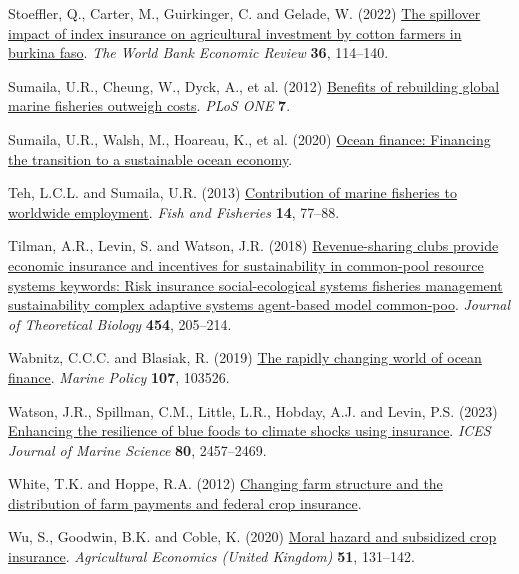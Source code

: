 \documentclass[
  letterpaper,
  DIV=11,
  numbers=noendperiod]{scrartcl}
\newlength{\cslhangindent}
\newlength{\cslentryspacingunit} %
\newenvironment{CSLReferences}[2] %
 {%
  \setlength{\parindent}{0pt}
  \ifodd #1
  \let\oldpar\par
  \def\par{\hangindent=\cslhangindent\oldpar}
  \fi
  \setlength{\parskip}{#2\cslentryspacingunit}
 }%
 {}
\theoremstyle{plain}
\theoremstyle{plain}
\theoremstyle{remark}
\begin{document}
\begin{CSLReferences}{1}{0}
\leavevmode{}%
Stoeffler, Q., Carter, M., Guirkinger, C. and Gelade, W. (2022)
\href{https://doi.org/10.1093/wber}{The spillover impact of index
insurance on agricultural investment by cotton farmers in burkina faso}.
\emph{The World Bank Economic Review} \textbf{36}, 114--140.

\leavevmode{}%
Sumaila, U.R., Cheung, W., Dyck, A., et al. (2012)
\href{https://doi.org/10.1371/journal.pone.0040542}{Benefits of
rebuilding global marine fisheries outweigh costs}. \emph{PLoS ONE}
\textbf{7}.

\leavevmode{}%
Sumaila, U.R., Walsh, M., Hoareau, K., et al. (2020)
\href{https://www.oceanpanel.org/blue-}{Ocean finance: Financing the
transition to a sustainable ocean economy}.

\leavevmode{}%
Teh, L.C.L. and Sumaila, U.R. (2013)
\href{https://doi.org/10.1111/j.1467-2979.2011.00450.x}{Contribution of
marine fisheries to worldwide employment}. \emph{Fish and Fisheries}
\textbf{14}, 77--88.

\leavevmode{}%
Tilman, A.R., Levin, S. and Watson, J.R. (2018)
\href{https://doi.org/10.1016/j.jtbi.2018.06.003}{Revenue-sharing clubs
provide economic insurance and incentives for sustainability in
common-pool resource systems keywords: Risk insurance social-ecological
systems fisheries management sustainability complex adaptive systems
agent-based model common-poo}. \emph{Journal of Theoretical Biology}
\textbf{454}, 205--214.

\leavevmode{}%
Wabnitz, C.C.C. and Blasiak, R. (2019)
\href{https://doi.org/10.1016/j.marpol.2019.103526}{The rapidly changing
world of ocean finance}. \emph{Marine Policy} \textbf{107}, 103526.

\leavevmode{}%
Watson, J.R., Spillman, C.M., Little, L.R., Hobday, A.J. and Levin, P.S.
(2023) \href{https://doi.org/10.1093/icesjms/fsad175}{Enhancing the
resilience of blue foods to climate shocks using insurance}. \emph{ICES
Journal of Marine Science} \textbf{80}, 2457--2469.

\leavevmode{}%
White, T.K. and Hoppe, R.A. (2012)
\href{https://www.ers.usda.gov}{Changing farm structure and the
distribution of farm payments and federal crop insurance}.

\leavevmode{}%
Wu, S., Goodwin, B.K. and Coble, K. (2020)
\href{https://doi.org/10.1111/agec.12545}{Moral hazard and subsidized
crop insurance}. \emph{Agricultural Economics (United Kingdom)}
\textbf{51}, 131--142.

\end{CSLReferences}
\end{document}
